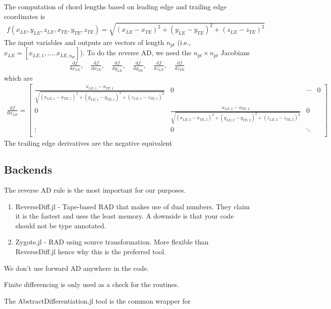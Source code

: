 \documentclass[10pt]{article}
\newcommand{\dd}[2]{\frac{\textrm{d} #1}{\textrm{d} #2}}
\newcommand{\ben}{\begin{eqnarray*}}
\newcommand{\een}{\end{eqnarray*}}
\newcommand{\beq}{\begin{equation}\begin{aligned}}
\newcommand{\eeq}{\end{aligned}\end{equation}}
\begin{document}
The computation of chord lengths based on leading edge and trailing edge coordinates is
\beq
f(x_{LE},y_{LE},z_{LE}, x_{TE},y_{TE},z_{TE}) =
\sqrt{
	\left(x_{LE} - x_{TE}\right)^2
	+
	\left(y_{LE} - y_{TE}\right)^2
	+
	\left(z_{LE} - z_{TE}\right)^2
}
\eeq
The input variables and outputs are vectors of length $n_{pt}$ (i.e., $x_{LE} = [x_{LE,1},\dots,x_{LE,n_{pt}}]$).
To do the reverse AD, we need the $n_{pt}\times n_{pt}$ Jacobians
\ben
\dd{f}{x_{LE}},
\quad
\dd{f}{x_{TE}},
\quad
\dd{f}{y_{LE}},
\quad
\dd{f}{y_{TE}},
\quad
\dd{f}{z_{LE}},
\quad
\dd{f}{z_{TE}}
\een
which are
\beq
\dd{f}{x_{LE}} = \begin{bmatrix}
	\frac{ x_{LE,1}-x_{TE,1} }{ \sqrt{ \left( x_{LE,1}-x_{TE,1} \right)^2 + \left( y_{LE,1} - y_{TE,1} \right)^2 + \left( z_{LE,1}-z_{TE,1} \right)^2 }} & 0                                                                                                                                                    & \cdots & 0 \\
	0                                                                                                                                                    & \frac{ x_{LE,2}-x_{TE,2} }{ \sqrt{ \left( x_{LE,2}-x_{TE,2} \right)^2 + \left( y_{LE,2} - y_{TE,2} \right)^2 + \left( z_{LE,2}-z_{TE,2} \right)^2 }} & 0          \\
	\vdots                                                                                                                                               & 0                                                                                                                                                    & \ddots     \\
\end{bmatrix}
\eeq
The trailing edge derivatives are the negative equivalent


\subsection{Backends}

The reverse AD rule is the most important for our purposes.

\begin{enumerate}
	\item ReverseDiff.jl - Tape-based RAD that makes use of dual numbers. They claim it is the fastest and uses the least memory. A downside is that your code should not be type annotated.
	\item Zygote.jl - RAD using source transformation. More flexible than ReverseDiff.jl hence why this is the preferred tool.
\end{enumerate}

We don't use forward AD anywhere in the code.

Finite differencing is only used as a check for the routines.

The AbstractDifferentiation.jl tool is the common wrapper for


\onecolumn
\appendix

\end{document}
